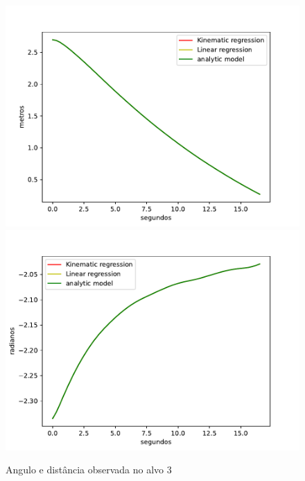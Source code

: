 \begin{figure}[H]
    \centering
    \includegraphics[scale=0.3]{figuras/distance_over_time_3.pdf}
    \hspace{1cm}
    \includegraphics[scale=0.3]{figuras/angle_over_time_3.pdf}
    \caption{Angulo e distância observada no alvo 3}
\end{figure}

